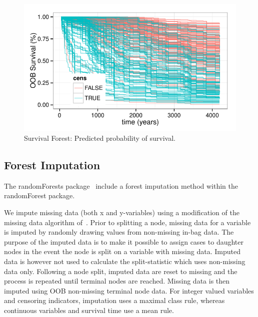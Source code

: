 \documentclass[nojss]{jss}\usepackage[]{graphicx}\usepackage[]{color}
\makeatletter
\def\maxwidth{ %
  \ifdim\Gin@nat@width>\linewidth
    \linewidth
  \else
    \Gin@nat@width
  \fi
}
\newenvironment{knitrout}{}{} %
\makeatother
\begin{document}
\begin{knitrout}\footnotesize
{}\color{fgcolor}\begin{figure}[!htpb]


{\centering \includegraphics[width=\maxwidth]{figure/vig-surv-rf-plot-1} 

}

\caption[Survival Forest]{Survival Forest: Predicted probability of survival.\label{fig:surv-rf-plot}}
\end{figure}


\end{knitrout}


\subsection{Forest Imputation}\label{S:imputation}

The randomForests package~\citep{liaw:2002} include a forest imputation method within the randomForest package. 

We impute missing data (both x and y-variables) using a modification of the missing data algorithm of~\cite{Ishwaran:2008}. Prior to splitting a node, missing data for a variable is imputed by randomly drawing values from non-missing in-bag data. The purpose of the imputed data is to make it possible to assign cases to daughter nodes in the event the node is split on a variable with missing data. Imputed data is however not used to calculate the split-statistic which uses non-missing data only. Following a node split, imputed data are reset to missing and the process is repeated until terminal nodes are reached. Missing data is then imputed using OOB non-missing terminal node data. For integer valued variables and censoring indicators, imputation uses a maximal class rule, whereas continuous variables and survival time use a mean rule.
\end{document}
